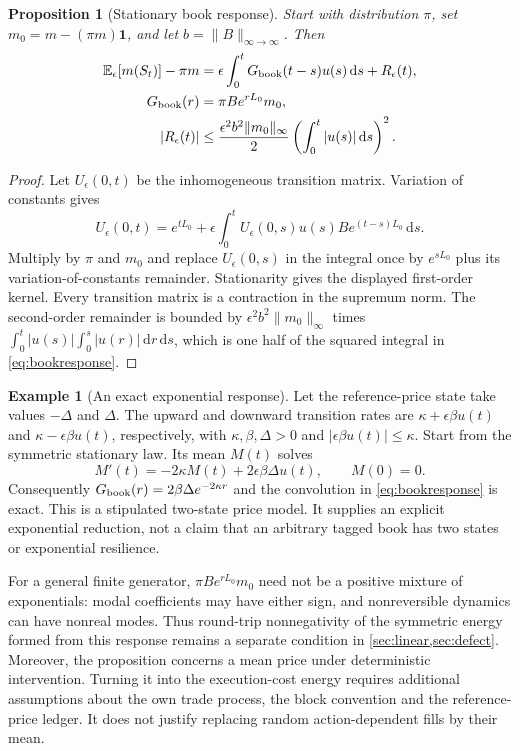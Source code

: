 \documentclass[11pt]{article}
\numberwithin{equation}{section}
\newtheorem{proposition}[theorem]{Proposition}
\theoremstyle{definition}
\theoremstyle{remark}
\newcommand{\E}{\mathbb{E}}
\theoremstyle{definition}
\newtheorem{example}[theorem]{Example}
\newcommand{\dd}{\,\mathrm d}
\begin{document}
\begin{proposition}[Stationary book response]\label{prop:bookresponse}
Start with distribution $\pi$, set $m_0=m-(\pi m)\mathbf1$, and let
$b=\lVert B\rVert_{\infty\to\infty}$. Then
\begin{align}\label{eq:bookresponse}
 \E_\epsilon[m(S_t)]-\pi m
 &=\epsilon\int_0^t G_{\rm book}(t-s)u(s)\dd s+R_\epsilon(t),\\
 G_{\rm book}(r)&=\pi B e^{rL_0}m_0,\nonumber\\
 |R_\epsilon(t)|&\le
 \frac{\epsilon^2 b^2\lVert m_0\rVert_\infty}{2}
                 \left(\int_0^t|u(s)|\dd s\right)^2.\nonumber
\end{align}
\end{proposition}
\begin{proof}
Let $U_\epsilon(0,t)$ be the inhomogeneous transition matrix. Variation of
constants gives
\[
 U_\epsilon(0,t)=e^{tL_0}
  +\epsilon\int_0^t U_\epsilon(0,s)u(s)B e^{(t-s)L_0}\dd s.
\]
Multiply by $\pi$ and $m_0$ and replace $U_\epsilon(0,s)$ in the integral
once by $e^{sL_0}$ plus its variation-of-constants remainder. Stationarity
gives the displayed first-order kernel. Every transition matrix is a
contraction in the supremum norm. The second-order remainder is bounded by
$\epsilon^2b^2\lVert m_0\rVert_\infty$ times
$\int_0^t|u(s)|\int_0^s|u(r)|\dd r\dd s$, which is one half of the
squared integral in \eqref{eq:bookresponse}.
\end{proof}

\begin{example}[An exact exponential response]\label{ex:bookexponential}
Let the reference-price state take values $-\Delta$ and $\Delta$. The upward
and downward transition rates are $\kappa+\epsilon\beta u(t)$ and
$\kappa-\epsilon\beta u(t)$, respectively, with $\kappa,\beta,\Delta>0$
and $|\epsilon\beta u(t)|\le\kappa$. Start from the symmetric stationary
law. Its mean $M(t)$ solves
\[
 M'(t)=-2\kappa M(t)+2\epsilon\beta\Delta u(t),\qquad M(0)=0.
\]
Consequently $G_{\rm book}(r)=2\beta\Delta e^{-2\kappa r}$ and the
convolution in \eqref{eq:bookresponse} is exact. This is a stipulated
two-state price model. It supplies an explicit exponential reduction, not a
claim that an arbitrary tagged book has two states or exponential resilience.
\end{example}

For a general finite generator, $\pi B e^{rL_0}m_0$ need not be a positive
mixture of exponentials: modal coefficients may have either sign, and
nonreversible dynamics can have nonreal modes. Thus round-trip
nonnegativity of the symmetric energy formed from this response remains a
separate condition in \cref{sec:linear,sec:defect}. Moreover, the proposition
concerns a mean price under deterministic intervention. Turning it into the
execution-cost energy requires additional assumptions about the own trade
process, the block convention and the reference-price ledger. It does not
justify replacing random action-dependent fills by their mean.
\end{document}
